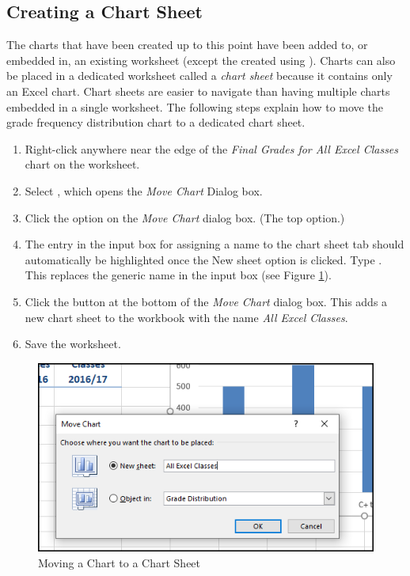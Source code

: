 \subsection{Creating a Chart Sheet}

The charts that have been created up to this point have been added to, or embedded in, an existing worksheet (except the  created using ). Charts can also be placed in a dedicated worksheet called a \textit{chart sheet} because it contains only an Excel chart. Chart sheets are easier to navigate than having multiple charts embedded in a single worksheet. The following steps explain how to move the grade frequency distribution chart to a dedicated chart sheet.

\begin{enumerate}
	\item Right-click anywhere near the edge of the \textit{Final Grades for All Excel Classes} chart on the  worksheet.
	\item Select , which opens the \textit{Move Chart} Dialog box.
	\item Click the  option on the \textit{Move Chart} dialog box. (The top option.)
	\item The entry in the input box for assigning a name to the chart sheet tab should automatically be highlighted once the New sheet option is clicked. Type . This replaces the generic name in the input box (see Figure \ref{04:fig15}).
	\item Click the  button at the bottom of the \textit{Move Chart} dialog box. This adds a new chart sheet to the workbook with the name \textit{All Excel Classes}.
	\item Save the worksheet.
\end{enumerate}

\begin{figure}[H]
	\centering
	\includegraphics[width=\maxwidth{.95\linewidth}]{gfx/ch04_fig15}
	\caption{Moving a Chart to a Chart Sheet}
	\label{04:fig15}
\end{figure}


